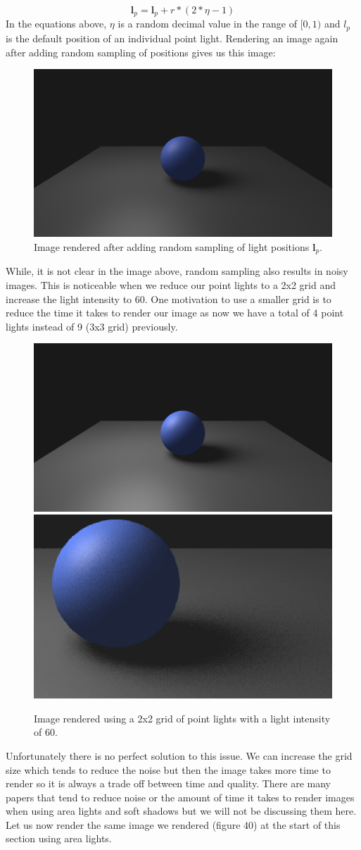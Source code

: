 \documentclass[11pt,a4paper]{article}
\begin{document}
 	\begin{equation}
 		\boldsymbol{l}_{p} = \boldsymbol{l}_{p} + r * (2 * \eta - 1)
 	\end{equation}
 	\noindent
 	In the equations above, $\eta$ is a random decimal value in the range of $[0, 1)$ and $l_{p}$ is the default position of an individual point light. Rendering an image again after adding random sampling of positions gives us this image:
 	\begin{figure}[H]
 		\centering
 		\captionsetup{justification=centering}
 		\includegraphics[width=.5\textwidth]{arealight5}\quad
 		\caption{Image rendered after adding random sampling of light positions $\boldsymbol{l}_{p}$.}
 	\end{figure}
 	\noindent
 	While, it is not clear in the image above, random sampling also results in noisy images. This is noticeable when we reduce our point lights to a 2x2 grid and increase the light intensity to $60$. One motivation to use a smaller grid is to reduce the time it takes to render our image as now we have a total of 4 point lights instead of 9 (3x3 grid) previously.
 	\begin{figure}[H]
 		\centering
 		\captionsetup{justification=centering}
 		\includegraphics[width=.35\textwidth]{arealight6}\quad
 		\includegraphics[width=.32\textwidth]{noisy}\quad
 		\caption{Image rendered using a 2x2 grid of point lights with a light intensity of $60$.}
 	\end{figure}
 	\noindent
 	Unfortunately there is no perfect solution to this issue. We can increase the grid size which tends to reduce the noise but then the image takes more time to render so it is always a trade off between time and quality. There are many papers that tend to reduce noise or the amount of time it takes to render images when using area lights and soft shadows but we will not be discussing them here. Let us now render the same image we rendered (figure 40) at the start of this section using area lights.
 
\end{document}
